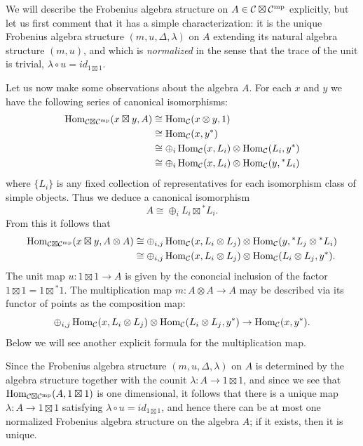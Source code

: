 \documentclass{amsart}
\begin{document}
We will describe the Frobenius algebra structure on $A \in \mathcal C \boxtimes \mathcal C^{\mathrm{mp}}$ explicitly, but let us first comment that it has a simple characterization: it is the unique Frobenius algebra structure $(m, u, \Delta, \lambda)$ on $A$ extending its natural algebra structure $(m,u)$, and which is {\em normalized} in the sense that the trace of the unit is trivial, $\lambda \circ u = id_{1 \boxtimes 1}$.

Let us now make some observations about the algebra $A$. For each $x$ and $y$ we have the following series of canonical isomorphisms:
\begin{align*}
	\operatorname{Hom}_{\mathcal C \boxtimes \mathcal C^{\mathrm{mp}}}( x \boxtimes y , A) & \cong \operatorname{Hom}_{\mathcal C}(x \otimes y, 1) \\
	 & \cong \operatorname{Hom}_{\mathcal C}(x, y^*) \\
	 & \cong \oplus_i \operatorname{Hom}_{\mathcal C}(x, L_i) \otimes \operatorname{Hom}_{\mathcal C}(L_i, y^*) \\
	 & \cong \oplus_i \operatorname{Hom}_{\mathcal C}(x, L_i) \otimes \operatorname{Hom}_{\mathcal C}(y, {}^*L_i)	 
\end{align*}
where $\{L_i\}$ is any fixed collection of representatives for each isomorphism class of simple objects. Thus we deduce a canonical isomorphism
\begin{equation*}
	A \cong \oplus_i L_i \boxtimes {}^*L_i.
\end{equation*}
From this it follows that 
\begin{align*}
	\operatorname{Hom}_{\mathcal C \boxtimes \mathcal C^{\mathrm{mp}}}( x \boxtimes y , A \otimes A) & \cong \oplus_{i,j} \operatorname{Hom}_{\mathcal C}(x, L_i \otimes L_j) \otimes \operatorname{Hom}_{\mathcal C}(y, {}^* L_j \otimes {}^*L_i) \\
	& \cong \oplus_{i,j} \operatorname{Hom}_{\mathcal C}(x, L_i \otimes L_j) \otimes \operatorname{Hom}_{\mathcal C}(L_i \otimes L_j, y^*).
\end{align*}
The unit map $u: 1 \boxtimes 1 \to A$ is given by the cononcial inclusion of the factor $1 \boxtimes 1 = 1 \boxtimes {}^*1$. The multiplication map $m: A \otimes A \to A$ may be described via its functor of points as the composition map:
\begin{equation*}
	\oplus_{i,j} \operatorname{Hom}_{\mathcal C}(x, L_i \otimes L_j) \otimes \operatorname{Hom}_{\mathcal C}(L_i \otimes L_j, y^*) \to \operatorname{Hom}_{\mathcal C}(x, y^*).
\end{equation*}
Below we will see another explicit formula for the multiplication map. 

Since the Frobenius algebra structure $(m,u, \Delta, \lambda)$ on $A$ is determined by the algebra structure together with the counit $\lambda: A \to 1 \boxtimes 1$, and since we see that $\operatorname{Hom}_{\mathcal C \boxtimes \mathcal C^{\mathrm{mp}}}(A, 1 \boxtimes 1)$ is one dimensional, it follows that there is a unique map $\lambda:A \to 1 \boxtimes 1$ satisfying $\lambda \circ u = id_{1 \boxtimes 1}$, and hence there can be at most one normalized Frobenius algebra structure on the algebra $A$; if it exists, then it is unique. 
\end{document}

